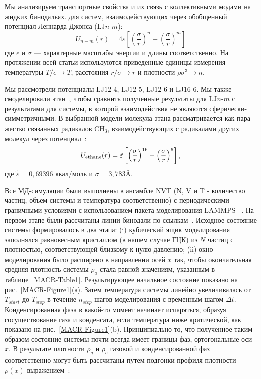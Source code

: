 Мы анализируем транспортные свойства и их связь с коллективными модами на жидких бинодальях.
для систем, взаимодействующих через обобщенный потенциал Леннарда-Джонса (LJ$n$-$m$):
\begin{equation}
U_{n-m}(r)=4 \varepsilon\left[\left(\frac{\sigma}{r}\right)^{n}-\left(\frac{\sigma}{r}\right)^{m}\right]
\label{MACR-eq1}
\end{equation}
где $\epsilon$ и $\sigma$ — характерные масштабы энергии и длины соответственно. На протяжении всей статьи используются приведенные единицы измерения температуры $ T/ \epsilon \rightarrow T $, расстояния $ r/ \sigma \rightarrow r $ и плотности $ \rho \sigma ^ 3 \rightarrow n$.


Мы рассмотрели потенциалы LJ$12$-$4$, LJ$12$-$5$, LJ$12$-$6$ и LJ$16$-$6$. Мы также смоделировали этан~\cite{10.1021/acs.jced.6b01036}, чтобы сравнить полученные результаты для LJ$n$-$m$ с результатами для системы, в которой взаимодействия не являются сферически-симметричными.
В выбранной модели молекула этана рассматривается как пара жестко связанных радикалов CH$_3$, взаимодействующих с радикалами других молекул через потенциал~\cite{10.1021/acs.jced.6b01036}:
\begin{equation}
U_{\rm {ethane}}(r) = \tilde \varepsilon\left[\left(\frac{\sigma}{r}\right)^{16}-\left(\frac{\sigma}{r}\right)^{6}\right],
\label{MACR-eq2}
\end{equation}
где $\tilde\varepsilon = 0,69396$ ккал/моль и $\sigma = 3,783$\AA.

Все МД-симуляции были выполнены в ансамбле NVT (N, V и T - количество частиц, объем системы и температура соответственно) с периодическими граничными условиями с использованием пакета моделирования LAMMPS~\cite{10.1006/jcph.1995.1039} .
На первом этапе были рассчитаны линии бинодали по ссылкам~\cite{10.1021/jp806127j, 10.1021/jp1117213}.
Исходное состояние системы формировалось в два этапа: (i) кубический ящик моделирования заполнялся равновесным кристаллом (в нашем случае ГЦК) из $N$ частиц с плотностью, соответствующей близкому к нулю давлению; (ii) окно моделирования было расширено в направлении осей $x$ так, чтобы окончательная средняя плотность системы $\rho_a$ стала равной значениям, указанным в таблице~\ref{MACR-Table1}.
Результирующее начальное состояние показано на рис.~\ref{MACR-Figure1}(а).
Затем температура системы линейно увеличивалась от $T_{start}$ до $T_{stop}$ в течение $n_{step}$ шагов моделирования с временным шагом $\Delta t$.
Конденсированная фаза в какой-то момент начинает испаряться, образуя сосуществование газа и конденсата, если температура ниже критической, как показано на рис.~\ref{MACR-Figure1}(b).
Принципиально то, что полученное таким образом состояние системы почти всегда имеет границы фаз, ортогональные оси $x$.
В результате плотности $\rho_g$ и $\rho_c$ газовой и конденсированной фаз соответственно могут быть рассчитаны путем подгонки профиля плотности $\rho(x)$ выражением~\cite{10.1021/jp806127j, 10.1021/jp1117213}:

